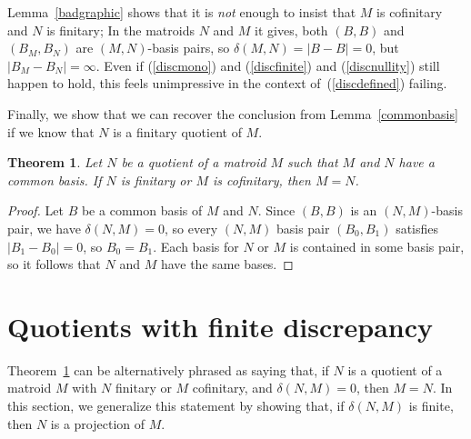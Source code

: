 \documentclass{amsart}
\theoremstyle{plain}
\newtheorem{theorem}{Theorem}[section]
\theoremstyle{definition}
\begin{document}
Lemma~\ref{badgraphic} shows that it is \emph{not} enough to insist that $M$ is cofinitary and $N$ is finitary;
In the matroids $N$ and $M$ it gives, 
both $(B,B)$ and $(B_M,B_N)$ are $(M,N)$-basis pairs, 
so $\delta(M,N) = |B-B| = 0$, but $|B_M - B_N| = \infty$. 
Even if (\ref{discmono}) and (\ref{discfinite}) and (\ref{discnullity}) still happen to hold, 
this feels unimpressive in the context of~(\ref{discdefined}) failing.

Finally, we show that we can recover the conclusion from Lemma~\ref{commonbasis} if we know that $N$ is a finitary quotient of $M$. 

\begin{theorem}\label{finitarycommonbasis}
  Let $N$ be a quotient of a matroid $M$ such that $M$ and $N$ have a common basis. If $N$ is finitary or $M$ is cofinitary, 
  then $M = N$. 
\end{theorem}
\begin{proof}
  Let $B$ be a common basis of $M$ and $N$. Since $(B,B)$ is an $(N,M)$-basis pair, 
  we have $\delta(N,M) = 0$, so every $(N,M)$ basis pair $(B_0,B_1)$ satisfies $|B_1 - B_0| = 0$, so $B_0 = B_1$. 
  Each basis for $N$ or $M$ is contained in some basis pair, so it follows that $N$ and $M$ have the same bases. 
\end{proof}

\section{Quotients with finite discrepancy}

Theorem~\ref{finitarycommonbasis} can be alternatively phrased as saying that, 
if $N$ is a quotient of a matroid $M$ with $N$ finitary or $M$ cofinitary, and $\delta(N,M) = 0$, then $M = N$. 
In this section, we generalize this statement by showing that, if $\delta(N,M)$ is finite, then $N$ is a projection of $M$. 
\end{document}
